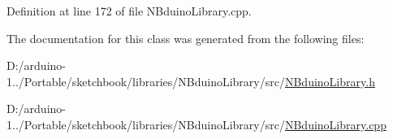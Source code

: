 Definition at line 172 of file N\+Bduino\+Library.\+cpp.



The documentation for this class was generated from the following files\+:\begin{DoxyCompactItemize}
\item 
D\+:/arduino-\/1../\+Portable/sketchbook/libraries/\+N\+Bduino\+Library/src/\mbox{\hyperlink{_n_bduino_library_8h}{N\+Bduino\+Library.\+h}}\item 
D\+:/arduino-\/1../\+Portable/sketchbook/libraries/\+N\+Bduino\+Library/src/\mbox{\hyperlink{_n_bduino_library_8cpp}{N\+Bduino\+Library.\+cpp}}\end{DoxyCompactItemize}

